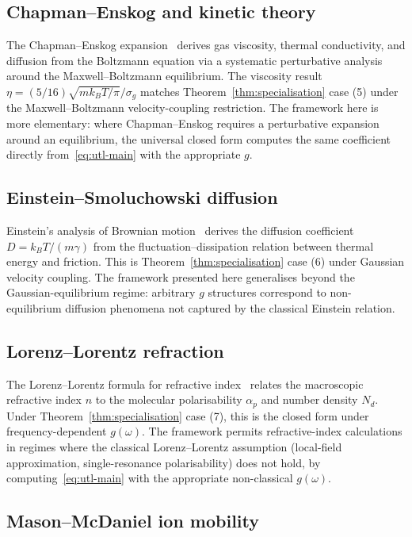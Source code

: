 \documentclass[twocolumn,11pt,a4paper]{article}
\newcommand{\cpl}{g}
\begin{document}
\subsection{Chapman--Enskog and kinetic theory}

The Chapman--Enskog expansion~\citep{chapman1970} derives gas viscosity, thermal conductivity, and diffusion from the Boltzmann equation via a systematic perturbative analysis around the Maxwell--Boltzmann equilibrium. The viscosity result $\eta = (5/16) \sqrt{m k_B T / \pi} / \sigma_g$ matches Theorem~\ref{thm:specialisation} case (5) under the Maxwell--Boltzmann velocity-coupling restriction. The framework here is more elementary: where Chapman--Enskog requires a perturbative expansion around an equilibrium, the universal closed form computes the same coefficient directly from~\eqref{eq:utl-main} with the appropriate $\cpl$.

\subsection{Einstein--Smoluchowski diffusion}

Einstein's analysis of Brownian motion~\citep{einstein1905brownian,smoluchowski1906} derives the diffusion coefficient $D = k_B T / (m \gamma)$ from the fluctuation--dissipation relation between thermal energy and friction. This is Theorem~\ref{thm:specialisation} case (6) under Gaussian velocity coupling. The framework presented here generalises beyond the Gaussian-equilibrium regime: arbitrary $\cpl$ structures correspond to non-equilibrium diffusion phenomena not captured by the classical Einstein relation.

\subsection{Lorenz--Lorentz refraction}

The Lorenz--Lorentz formula for refractive index~\citep{lorenz1880,lorentz1880} relates the macroscopic refractive index $n$ to the molecular polarisability $\alpha_p$ and number density $N_d$. Under Theorem~\ref{thm:specialisation} case (7), this is the closed form under frequency-dependent $\cpl(\omega)$. The framework permits refractive-index calculations in regimes where the classical Lorenz--Lorentz assumption (local-field approximation, single-resonance polarisability) does not hold, by computing~\eqref{eq:utl-main} with the appropriate non-classical $\cpl(\omega)$.

\subsection{Mason--McDaniel ion mobility}
\end{document}
